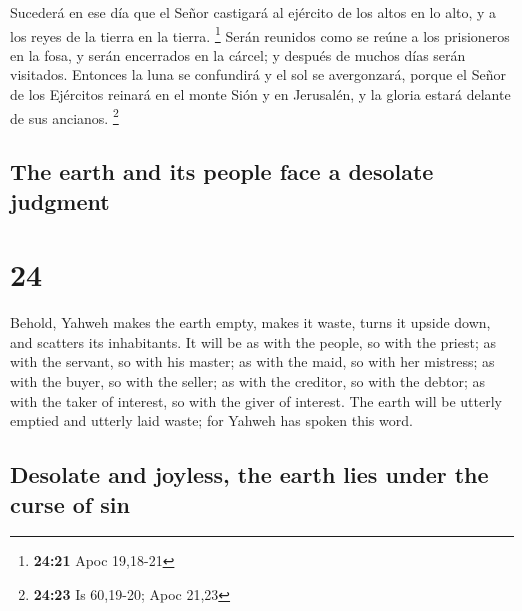 \begin{paracol}{2}
 Sucederá en ese día que el Señor castigará al ejército
de los altos en lo alto, y a los reyes de la tierra en la tierra.
\footnote{\textbf{24:21} Apoc 19,18-21}  Serán reunidos
como se reúne a los prisioneros en la fosa, y serán encerrados en la
cárcel; y después de muchos días serán visitados. 
Entonces la luna se confundirá y el sol se avergonzará, porque el Señor
de los Ejércitos reinará en el monte Sión y en Jerusalén, y la gloria
estará delante de sus ancianos. \footnote{\textbf{24:23} Is 60,19-20;
  Apoc 21,23}

\switchcolumn
\begin{otherlanguage}{english}

\hypertarget{the-earth-and-its-people-face-a-desolate-judgment}{%
\subsection{The earth and its people face a desolate
judgment}\label{the-earth-and-its-people-face-a-desolate-judgment}}

\hypertarget{section-47}{%
\section{24}\label{section-47}}

 Behold, Yahweh makes the earth empty, makes it waste,
turns it upside down, and scatters its inhabitants.  It
will be as with the people, so with the priest; as with the servant, so
with his master; as with the maid, so with her mistress; as with the
buyer, so with the seller; as with the creditor, so with the debtor; as
with the taker of interest, so with the giver of interest.
 The earth will be utterly emptied and utterly laid waste;
for Yahweh has spoken this word.

\hypertarget{desolate-and-joyless-the-earth-lies-under-the-curse-of-sin}{%
\subsection{Desolate and joyless, the earth lies under the curse of
sin}\label{desolate-and-joyless-the-earth-lies-under-the-curse-of-sin}}


\end{otherlanguage}
\end{paracol}
